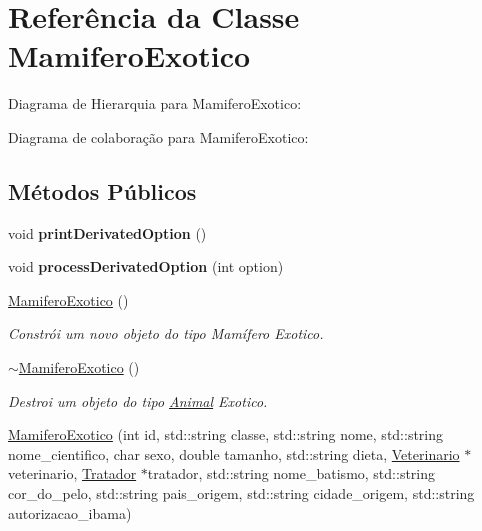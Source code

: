 \hypertarget{classMamiferoExotico}{}\section{Referência da Classe Mamifero\+Exotico}
\label{classMamiferoExotico}


Diagrama de Hierarquia para Mamifero\+Exotico\+:


Diagrama de colaboração para Mamifero\+Exotico\+:
\subsection*{Métodos Públicos}
\begin{DoxyCompactItemize}
\item 
\mbox{\label{classMamiferoExotico_ab2916b8a00959584b89421667d768931}} 
void {\bfseries print\+Derivated\+Option} ()
\item 
\mbox{\label{classMamiferoExotico_ac4667d033b45d5a2d38e538fc5b3827d}} 
void {\bfseries process\+Derivated\+Option} (int option)
\item 
\mbox{\label{classMamiferoExotico_a7dda2506d9e38c14b6d85fa666344ed6}} 
\hyperlink{classMamiferoExotico_a7dda2506d9e38c14b6d85fa666344ed6}{Mamifero\+Exotico} ()
\begin{DoxyCompactList}\small\item\em Constrói um novo objeto do tipo Mamífero Exotico. \end{DoxyCompactList}\item 
\mbox{\label{classMamiferoExotico_a2ab6c04adde874cc40aa55b5f586c15a}} 
\hyperlink{classMamiferoExotico_a2ab6c04adde874cc40aa55b5f586c15a}{$\sim$\+Mamifero\+Exotico} ()
\begin{DoxyCompactList}\small\item\em Destroi um objeto do tipo \hyperlink{classAnimal}{Animal} Exotico. \end{DoxyCompactList}\item 
\hyperlink{classMamiferoExotico_a79b2b19d1c2de729de2b92c173521379}{Mamifero\+Exotico} (int id, std\+::string classe, std\+::string nome, std\+::string nome\+\_\+cientifico, char sexo, double tamanho, std\+::string dieta, \hyperlink{classVeterinario}{Veterinario} $\ast$veterinario, \hyperlink{classTratador}{Tratador} $\ast$tratador, std\+::string nome\+\_\+batismo, std\+::string cor\+\_\+do\+\_\+pelo, std\+::string pais\+\_\+origem, std\+::string cidade\+\_\+origem, std\+::string autorizacao\+\_\+ibama)

\end{DoxyCompactItemize}
